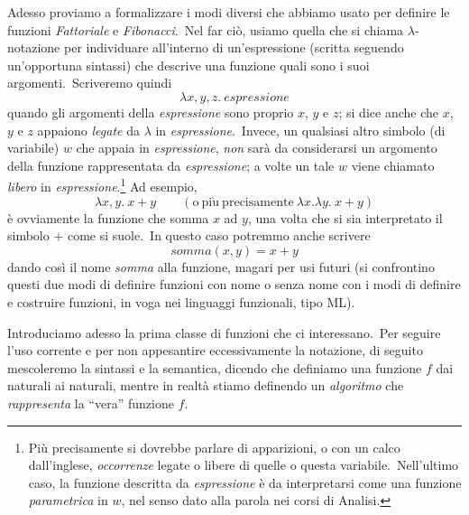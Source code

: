 \noindent Adesso proviamo a formalizzare i modi diversi che abbiamo usato per definire le funzioni \textit{Fattoriale} e \textit{Fibonacci}.\
Nel far ciò, usiamo quella che si chiama $\lambda$-notazione per individuare all'interno di un'espressione (scritta seguendo un'opportuna sintassi) che descrive una funzione quali sono i suoi argomenti.\
Scriveremo quindi
\[\lambda x,y,z.\ \mathit{espressione}\]
quando gli argomenti della \textit{espressione} sono proprio $x$, $y$ e $z$; si dice anche che $x$, $y$ e $z$ appaiono \textit{legate} da $\lambda$ in \textit{espressione}.\
Invece, un qualsiasi altro simbolo (di variabile) $w$ che appaia in \textit{espressione}, \textit{non} sarà da considerarsi un argomento della funzione rappresentata da \textit{espressione}; a volte un tale $w$ viene chiamato \textit{libero} in \textit{espressione}.\footnote{Più precisamente si dovrebbe parlare di apparizioni, o con un calco dall'inglese, \textit{occorrenze} legate o libere di quelle o questa variabile.\ Nell'ultimo caso, la funzione descritta da \textit{espressione} è da interpretarsi come una funzione \textit{parametrica} in $w$, nel senso dato alla parola nei corsi di Analisi.}
Ad esempio,
\[\lambda x,y.\ x+y\qquad (\mathrm{o\ pi\grave{u}\ precisamente}\ \lambda x.\lambda y.\ x + y)\]
è ovviamente la funzione che somma $x$ ad $y$, una volta che si sia interpretato il simbolo $+$ come si suole.\
In questo caso potremmo anche scrivere
\[\mathit{somma}(x,y) = x + y\]
dando così il nome \textit{somma} alla funzione, magari per usi futuri (si confrontino questi due modi di definire funzioni con nome o senza nome con i modi di definire e costruire funzioni, in voga nei linguaggi funzionali, tipo ML).

Introduciamo adesso la prima classe di funzioni che ci interessano.\
Per seguire l'uso corrente e per non appesantire eccessivamente la notazione, di seguito mescoleremo la sintassi e la semantica, dicendo che definiamo una funzione $f$ dai naturali ai naturali, mentre in realtà stiamo definendo un \textit{algoritmo} che \textit{rappresenta} la ``vera'' funzione $f$.

